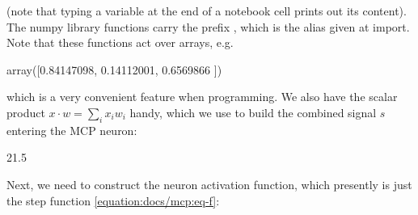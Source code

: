 \documentclass[a4paper,12pt,polish]{jupyterBook}
\begin{document}
\sphinxAtStartPar
(note that typing a variable at the end of a notebook cell prints out its content). The numpy library functions carry the prefix , which is the alias given at import. Note that these functions act  over arrays, e.g.
\begin{sphinxVerbatimInput}

\begin{sphinxVerbatim}[commandchars=\\\{\}]
\end{sphinxVerbatim}
\end{sphinxVerbatimInput}
\begin{sphinxVerbatimOutput}

\begin{sphinxVerbatim}[commandchars=\\\{\}]
array([0.84147098, 0.14112001, 0.6569866 ])
\end{sphinxVerbatim}
\end{sphinxVerbatimOutput}

\sphinxAtStartPar
which is a very convenient feature when programming. We also have the scalar product \(x \cdot w = \sum_i x_i w_i\) handy, which we use to build the combined signal \(s\) entering the MCP neuron:
\begin{sphinxVerbatimInput}

\begin{sphinxVerbatim}[commandchars=\\\{\}]
\end{sphinxVerbatim}
\end{sphinxVerbatimInput}
\begin{sphinxVerbatimOutput}

\begin{sphinxVerbatim}[commandchars=\\\{\}]
21.5
\end{sphinxVerbatim}
\end{sphinxVerbatimOutput}

\sphinxAtStartPar
Next, we need to construct the neuron activation function, which presently is just the step function \eqref{equation:docs/mcp:eq-f}:
\begin{sphinxVerbatimInput}

\begin{sphinxVerbatim}[commandchars=\\\{\}]
        
             
         
              
         
\end{sphinxVerbatim}
\end{sphinxVerbatimInput}
\end{document}
